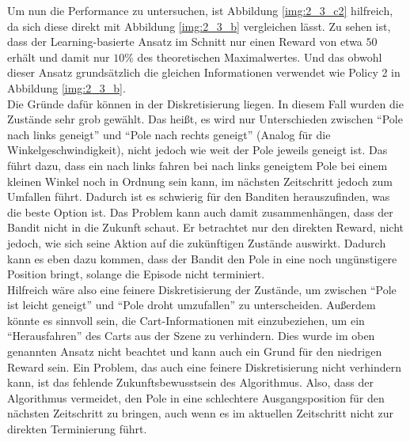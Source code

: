 \documentclass[11pt]{article}
\begin{document}
Um nun die Performance zu untersuchen, ist Abbildung \ref{img:2_3_c2} hilfreich, da sich diese direkt mit Abbildung \ref{img:2_3_b} vergleichen lässt. Zu sehen ist, dass der Learning-basierte Ansatz im Schnitt nur einen Reward von etwa $50$ erhält und damit nur $10\%$ des theoretischen Maximalwertes. Und das obwohl dieser Ansatz grundsätzlich die gleichen Informationen verwendet wie Policy 2 in Abbildung \ref{img:2_3_b}. \\
Die Gründe dafür können in der Diskretisierung liegen. In diesem Fall wurden die Zustände sehr grob gewählt. Das heißt, es wird nur Unterschieden zwischen ``Pole nach links geneigt'' und ``Pole nach rechts geneigt'' (Analog für die Winkelgeschwindigkeit), nicht jedoch wie weit der Pole jeweils geneigt ist. Das führt dazu, dass ein nach links fahren bei nach links geneigtem Pole bei einem kleinen Winkel noch in Ordnung sein kann, im nächsten Zeitschritt jedoch zum Umfallen führt. Dadurch ist es schwierig für den Banditen herauszufinden, was die beste Option ist. Das Problem kann auch damit zusammenhängen, dass der Bandit nicht in die Zukunft schaut. Er betrachtet nur den direkten Reward, nicht jedoch, wie sich seine Aktion auf die zukünftigen Zustände auswirkt. Dadurch kann es eben dazu kommen, dass der Bandit den Pole in eine noch ungünstigere Position bringt, solange die Episode nicht terminiert.\\
Hilfreich wäre also eine feinere Diskretisierung der Zustände, um zwischen ``Pole ist leicht geneigt'' und ``Pole droht umzufallen'' zu unterscheiden. Außerdem könnte es sinnvoll sein, die Cart-Informationen mit einzubeziehen, um ein ``Herausfahren'' des Carts aus der Szene zu verhindern. Dies wurde im oben genannten Ansatz nicht beachtet und kann auch ein Grund für den niedrigen Reward sein. Ein Problem, das auch eine feinere Diskretisierung nicht verhindern kann, ist das fehlende Zukunftsbewusstsein des Algorithmus. Also, dass der Algorithmus vermeidet, den Pole in eine schlechtere Ausgangsposition für den nächsten Zeitschritt zu bringen, auch wenn es im aktuellen Zeitschritt nicht zur direkten Terminierung führt. 
\end{document}
